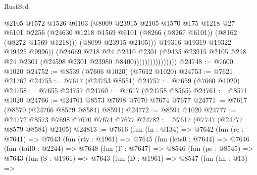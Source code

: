 \begin{lexlean}{RustStd}
\begin{coremodule}
                                    @2105
                                    @1572
                                    @1526
                                    @6103
                                    (@8009
                                      @23915
                                      @2105
                                      @1570
                                      @175
                                      @1218
                                      @27
                                      @6101
                                      @2256
                                      (@24630
                                        @1218
                                        @1569
                                        @6101
                                        (@8266 (@8267 @6101))
                                        (@8162 (@8272 @1569 @1218)))
                                      (@8099 @23915 @2105)))
                                  @19316
                                  @19319
                                  @19322
                                  @19325
                                  @9996))
                              (@24669
                                @218
                                @24
                                @2310
                                @2301
                                (@9435
                                  @23915
                                  @2105
                                  @218
                                  @24
                                  @2301
                                  (@24598 @2301 @23980 @8400))))))))))))))))
@24748 := @7600 @1020
@24752 := @8539 (@7606 @1020) (@7612 @1020)
@24753 := @7621 @21762
@24755 := @7617 (@24753 @8551)
@24757 := @7659 (@7660 @1020)
@24758 := @7655 @24757
@24760 := @7617 (@24758 @8565)
@24761 := @8571 @1020
@24766 := @24761 @8573 @7698 @7670 @7674 @7677
@24771 := @7617 (@8570 (@24766 @8579 @8584) @8591)
@24772 := @8594 @1020
@24777 := @24772 @8573 @7698 @7670 @7674 @7677
@24782 := @7617 (@7747 (@24777 @8579 @8584) @2105)
@24813 := @7616
    (fun (fn : @134) =>
    @7642
      (fun (rc : @7641) =>
      @7643
        (fun (rty : @1961) =>
        @7645
          (fun (lets0 : @7644) =>
          @7646
            (fun (tail0 : @2244) =>
            @7648
              (fun (Γ : @7647) =>
              @8546
                (fun (ps : @8545) =>
                @7643
                  (fun (S : @1961) =>
                  @7643
                    (fun (D : @1961) =>
                    @8547
                      (fun (hn : @13) =>

\end{coremodule}
\end{lexlean}
